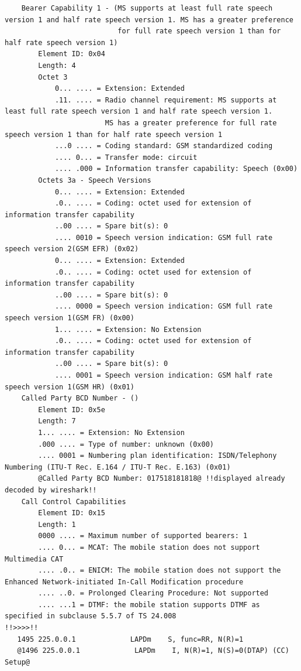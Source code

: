 \begin{lstlisting}
    Bearer Capability 1 - (MS supports at least full rate speech version 1 and half rate speech version 1. MS has a greater preference
                           for full rate speech version 1 than for half rate speech version 1)
        Element ID: 0x04
        Length: 4
        Octet 3
            0... .... = Extension: Extended
            .11. .... = Radio channel requirement: MS supports at least full rate speech version 1 and half rate speech version 1.
                        MS has a greater preference for full rate speech version 1 than for half rate speech version 1
            ...0 .... = Coding standard: GSM standardized coding
            .... 0... = Transfer mode: circuit
            .... .000 = Information transfer capability: Speech (0x00)
        Octets 3a - Speech Versions
            0... .... = Extension: Extended
            .0.. .... = Coding: octet used for extension of information transfer capability
            ..00 .... = Spare bit(s): 0
            .... 0010 = Speech version indication: GSM full rate speech version 2(GSM EFR) (0x02)
            0... .... = Extension: Extended
            .0.. .... = Coding: octet used for extension of information transfer capability
            ..00 .... = Spare bit(s): 0
            .... 0000 = Speech version indication: GSM full rate speech version 1(GSM FR) (0x00)
            1... .... = Extension: No Extension
            .0.. .... = Coding: octet used for extension of information transfer capability
            ..00 .... = Spare bit(s): 0
            .... 0001 = Speech version indication: GSM half rate speech version 1(GSM HR) (0x01)
    Called Party BCD Number - ()
        Element ID: 0x5e
        Length: 7
        1... .... = Extension: No Extension
        .000 .... = Type of number: unknown (0x00)
        .... 0001 = Numbering plan identification: ISDN/Telephony Numbering (ITU-T Rec. E.164 / ITU-T Rec. E.163) (0x01)
        @Called Party BCD Number: 017518181818@ !!displayed already decoded by wireshark!!
    Call Control Capabilities
        Element ID: 0x15
        Length: 1
        0000 .... = Maximum number of supported bearers: 1
        .... 0... = MCAT: The mobile station does not support Multimedia CAT
        .... .0.. = ENICM: The mobile station does not support the Enhanced Network-initiated In-Call Modification procedure
        .... ..0. = Prolonged Clearing Procedure: Not supported
        .... ...1 = DTMF: the mobile station supports DTMF as specified in subclause 5.5.7 of TS 24.008
!!>>>>!!
   1495 225.0.0.1             LAPDm    S, func=RR, N(R)=1
   @1496 225.0.0.1             LAPDm    I, N(R)=1, N(S)=0(DTAP) (CC) Setup@ 

\end{lstlisting}
